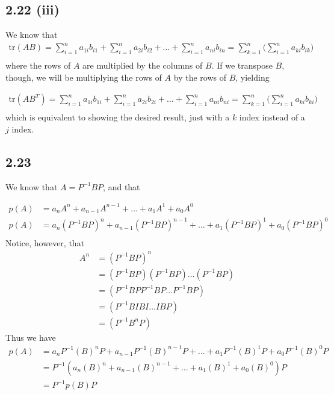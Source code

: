 \documentclass[letterpaper,12pt]{article}
\theoremstyle{definition}
\begin{document}
\subsection*{2.22 (iii)}

We know that
\begin{align*}
\text{tr} (AB) = \sum^{n}_{i=1} a_{1i} b_{i1} +\sum^{n}_{i=1} a_{2i} b_{i2} +\dots +\sum^{n}_{i=1} a_{ni} b_{in}= \sum^{n}_{k=1} \Big( \sum^{n}_{i=1} a_{ki} b_{ik} \Big)\\
\end{align*}
where the rows of $A$ are multiplied by the columns of $B$. If we transpose $B$, though, we will be multiplying the rows of $A$ by the rows of $B$, yielding

\begin{align*}
\text{tr} (AB^T) = \sum^{n}_{i=1} a_{1i} b_{1i} +\sum^{n}_{i=1} a_{2i} b_{2i} +\dots +\sum^{n}_{i=1} a_{ni} b_{ni}= \sum^{n}_{k=1} \Big( \sum^{n}_{i=1} a_{ki} b_{ki} \Big)\\
\end{align*}
which is equivalent to showing the desired result, just with a $k$ index instead of a $j$ index.

\subsection*{2.23}
We know that $A = P^{-1}BP$, and that 

\begin{align*}
p(A) &= a_nA^n + a_{n-1}A^{n-1} +\dots+ a_1A^1 + a_0A^0\\
p(A) &= a_n(P^{-1}BP)^n + a_{n-1}(P^{-1}BP)^{n-1} +\dots+ a_1(P^{-1}BP)^1 + a_0(P^{-1}BP)^0\\
\end{align*}
Notice, however, that 
\begin{align*}
A^n &=(P^{-1}BP)^n 
\\&= (P^{-1}BP)(P^{-1}BP)\dots(P^{-1}BP)
\\&= (P^{-1}BPP^{-1}BP\dots P^{-1}BP) 
\\&= (P^{-1}BIBI\dots IBP) 
\\&= (P^{-1}B^nP)
\end{align*}
Thus we have
\begin{align*}
p(A) &= a_nP^{-1}(B)^nP + a_{n-1}P^{-1}(B)^{n-1}P +\dots+ a_1P^{-1}(B)^1P + a_0P^{-1}(B)^0P
\\&= P^{-1}(a_n(B)^n + a_{n-1}(B)^{n-1} +\dots+ a_1(B)^1 + a_0(B)^0)P 
\\&= P^{-1}p(B)P 
\end{align*}
\end{document}
